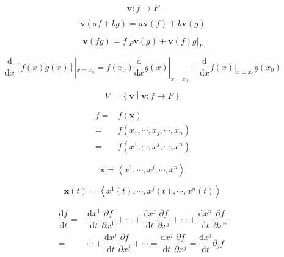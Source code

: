 \documentclass[
]{book}
\theoremstyle{definition}
\theoremstyle{definition}
\theoremstyle{definition}
\theoremstyle{definition}
\theoremstyle{remark}
\begin{document}
\[
\boldsymbol{v}:f\rightarrow F
\]

\[
\boldsymbol{v}\left(af+bg\right)=a\boldsymbol{v}\left(f\right)+b\boldsymbol{v}\left(g\right)
\]

\[
\boldsymbol{v}\left(fg\right)=f|_{{\scriptscriptstyle P}}\boldsymbol{v}\left(g\right)+\boldsymbol{v}\left(f\right)g|_{{\scriptscriptstyle P}}
\]

\[
\dfrac{\mathrm{d}}{\mathrm{d}x}\left[f\left(x\right)g\left(x\right)\right]|_{x=x_{{\scriptscriptstyle 0}}}=f\left(x_{{\scriptscriptstyle 0}}\right)\dfrac{\mathrm{d}}{\mathrm{d}x}g\left(x\right)|_{x=x_{{\scriptscriptstyle 0}}}+\dfrac{\mathrm{d}}{\mathrm{d}x}f\left(x\right)|_{x=x_{{\scriptscriptstyle 0}}}g\left(x_{{\scriptscriptstyle 0}}\right)
\]

\[
V=\left\{ \boldsymbol{v}\middle|\boldsymbol{v}:f\rightarrow F\right\} 
\]

\[
\begin{aligned}
f= & f\left(\boldsymbol{x}\right)\\
= & f\left(x_{{\scriptscriptstyle 1}},\cdots,x_{{\scriptscriptstyle j}},\cdots,x_{{\scriptscriptstyle n}}\right)\\
= & f\left(x^{{\scriptscriptstyle 1}},\cdots,x^{{\scriptscriptstyle j}},\cdots,x^{{\scriptscriptstyle n}}\right)
\end{aligned}
\]

\[
\boldsymbol{x}=\left\langle x^{{\scriptscriptstyle 1}},\cdots,x^{{\scriptscriptstyle j}},\cdots,x^{{\scriptscriptstyle n}}\right\rangle 
\]

\[
\boldsymbol{x}\left(t\right)=\left\langle x^{{\scriptscriptstyle 1}}\left(t\right),\cdots,x^{{\scriptscriptstyle j}}\left(t\right),\cdots,x^{{\scriptscriptstyle n}}\left(t\right)\right\rangle 
\]

\[
\begin{aligned}
\dfrac{\mathrm{d}f}{\mathrm{d}t}= & \dfrac{\mathrm{d}x^{{\scriptscriptstyle 1}}}{\mathrm{d}t}\dfrac{\partial f}{\partial x^{{\scriptscriptstyle 1}}}+\cdots+\dfrac{\mathrm{d}x^{{\scriptscriptstyle j}}}{\mathrm{d}t}\dfrac{\partial f}{\partial x^{{\scriptscriptstyle j}}}+\cdots+\dfrac{\mathrm{d}x^{{\scriptscriptstyle n}}}{\mathrm{d}t}\dfrac{\partial f}{\partial x^{{\scriptscriptstyle n}}}\\
= & \cdots+\dfrac{\mathrm{d}x^{{\scriptscriptstyle j}}}{\mathrm{d}t}\dfrac{\partial f}{\partial x^{{\scriptscriptstyle j}}}+\cdots=\dfrac{\mathrm{d}x^{{\scriptscriptstyle j}}}{\mathrm{d}t}\dfrac{\partial f}{\partial x^{{\scriptscriptstyle j}}}=\dfrac{\mathrm{d}x^{{\scriptscriptstyle j}}}{\mathrm{d}t}\partial_{{\scriptscriptstyle j}}f
\end{aligned}
\]
\end{document}
